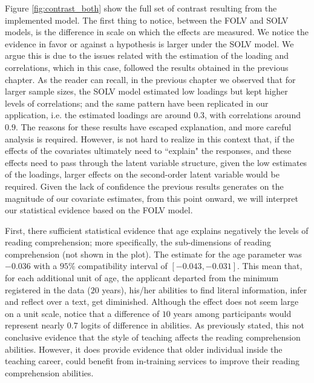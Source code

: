 Figure \ref{fig:contrast_both} show the full set of contrast resulting from the implemented model. The first thing to notice, between the FOLV and SOLV models, is the difference in scale on which the effects are measured. We notice the evidence in favor or against a hypothesis is larger under the SOLV model. We argue this is due to the issues related with the estimation of the loading and correlations, which in this case, followed the results obtained in the previous chapter. As the reader can recall, in the previous chapter we observed that for larger sample sizes, the SOLV model estimated low loadings but kept higher levels of correlations; and the same pattern have been replicated in our application, i.e. the estimated loadings are around $0.3$, with correlations around $0.9$. The reasons for these results have escaped explanation, and more careful analysis is required. However, is not hard to realize in this context that, if the effects of the covariates ultimately need to ``explain" the responses, and these effects need to pass through the latent variable structure, given the low estimates of the loadings, larger effects on the second-order latent variable would be required. Given the lack of confidence the previous results generates on the magnitude of our covariate estimates, from this point onward, we will interpret our statistical evidence based on the FOLV model.

First, there sufficient statistical evidence that age explains negatively the levels of reading comprehension; more specifically, the sub-dimensions of reading comprehension (not shown in the plot). The estimate for the age parameter was $-0.036$ with a $95\%$ compatibility interval of $[-0.043, -0.031]$. This mean that, for each additional unit of age, the applicant departed from the minimum registered in the data ($20$ years), his/her abilities to find literal information, infer and reflect over a text, get diminished. Although the effect does not seem large on a unit scale, notice that a difference of $10$ years among participants would represent nearly $0.7$ logits of difference in abilities. As previously stated, this not conclusive evidence that the style of teaching affects the reading comprehension abilities. However, it does provide evidence that older individual inside the teaching career, could benefit from in-training services to improve their reading comprehension abilities.


